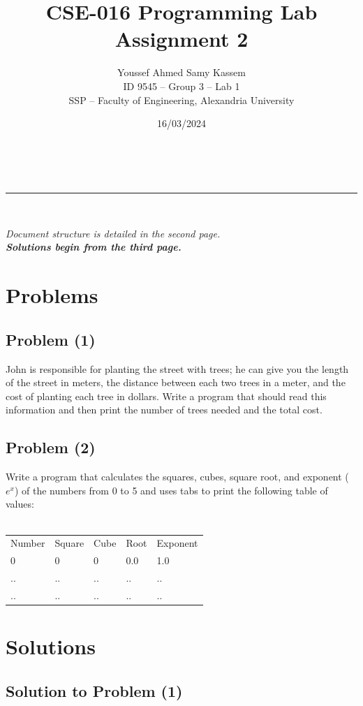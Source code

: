 \documentclass[a4paper,11pt]{article}
\makeatletter
\newcommand{\linia}{\rule{\linewidth}{0.5pt}}
\theoremstyle{mytheor}
\renewcommand{\maketitle}{
\begin{center}
\vspace{2ex}
{\huge \textsc{\@title}}
\vspace{1ex}
\\
\linia\\
\@date \hfill
\@author
\vspace{4ex}
\end{center}
}
\makeatother
\begin{document}
\title{CSE-016 Programming Lab Assignment \textnumero{} 2}

\date{16/03/2024}

\author{Youssef Ahmed Samy Kassem\\ \hfill ID 9545 -- Group 3 -- Lab 1\\ \hfill SSP -- Faculty of Engineering, Alexandria University\\}

\maketitle
\textit{Document structure is detailed in the second page.\\\textbf{Solutions begin from the third page.}}
\section{Problems}
\subsection{Problem (1)}
John is responsible for planting the street with trees; he can give you the length of the street in
meters, the distance between each two trees in a meter, and the cost of planting each tree in
dollars. Write a program that should read this information and then print the number of trees
needed and the total cost.
\subsection{Problem (2)}
Write a program that calculates the squares, cubes, square root, and exponent ($e^{x}$) of the
numbers from 0 to 5 and uses tabs to print the following table of values:\\\\
\setlength{\tabcolsep}{18pt}
\begin{tabular}{ l l l l l }
Number & Square & Cube & Root & Exponent \\ 
 0 & 0  & 0 & 0.0 & 1.0 \\  
 .. & .. & .. & .. & .. \\
 .. & .. & .. & .. & ..
\end{tabular}
\newpage
\tableofcontents
\newpage
\section{Solutions}
\subsection{Solution to Problem (1)}
\end{document}
